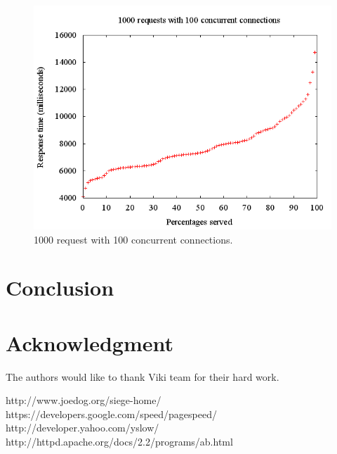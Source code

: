 \documentclass[conference]{./common/IEEEtran}
\begin{document}
\begin{figure}[ht]
\begin{minipage}[b]{\linewidth}\centering
\includegraphics[width=\textwidth]{include/gnu/1000_100.png}
\end{minipage}
\caption{1000 request with 100 concurrent connections.}
\label{fig:my_read_latency}
\end{figure}

\section{Conclusion} 

\section{Acknowledgment}
The authors would like to thank Viki team for their hard work.

\begin{thebibliography}{1}
http://www.joedog.org/siege-home/
https://developers.google.com/speed/pagespeed/
http://developer.yahoo.com/yslow/
http://httpd.apache.org/docs/2.2/programs/ab.html
\end{thebibliography}
\end{document}

